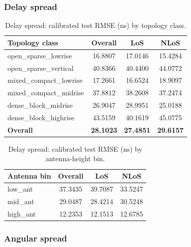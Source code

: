 \documentclass[11pt,a4paper]{article}
\begin{document}
\subsubsection{Delay spread}

\begin{table}[H]
\centering
\caption{Delay spread: calibrated test RMSE (ns) by topology class.}
\label{tab:ds_topo}
\begin{tabular}{lccc}
\toprule
Topology class & Overall & LoS & NLoS \\
\midrule
open\_sparse\_lowrise      & 16.8807 & 17.0146 & 15.4284 \\
open\_sparse\_vertical     & 40.8366 & 40.4400 & 44.0772 \\
mixed\_compact\_lowrise    & 17.2661 & 16.6524 & 18.9097 \\
mixed\_compact\_midrise    & 37.8812 & 38.2608 & 37.2474 \\
dense\_block\_midrise      & 26.9047 & 28.9951 & 25.0188 \\
dense\_block\_highrise     & 43.5159 & 40.1619 & 45.0775 \\
\midrule
\textbf{Overall}           & \textbf{28.1023} & \textbf{27.4851} & \textbf{29.6157} \\
\bottomrule
\end{tabular}
\end{table}

\begin{table}[H]
\centering
\caption{Delay spread: calibrated test RMSE (ns) by antenna-height bin.}
\label{tab:ds_ant}
\begin{tabular}{lccc}
\toprule
Antenna bin & Overall & LoS & NLoS \\
\midrule
low\_ant  & 37.3435 & 39.7087 & 33.5247 \\
mid\_ant  & 29.0487 & 28.4214 & 30.5248 \\
high\_ant & 12.2353 & 12.1513 & 12.6785 \\
\bottomrule
\end{tabular}
\end{table}

\subsubsection{Angular spread}
\end{document}
